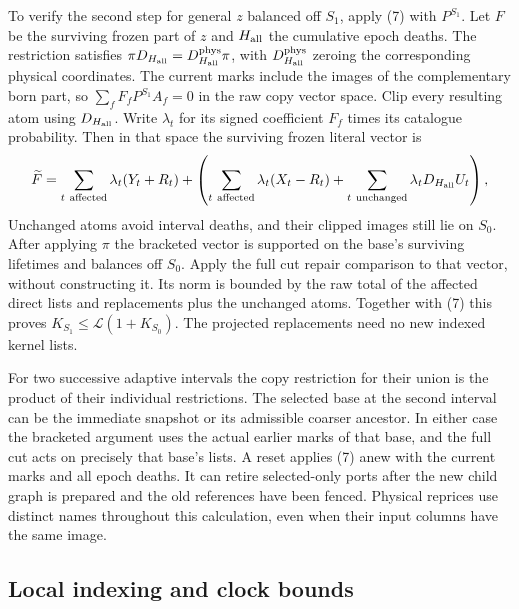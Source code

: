\documentclass[11pt]{article}
\begin{document}
To verify the second step for general \(z\) balanced off \(S_1\), apply (7) with \(P^{S_1}\). Let \(F\) be the surviving frozen part of \(z\) and \(H_{\rm all}\) the cumulative epoch deaths. The restriction satisfies \(\pi D_{H_{\rm all}}=D_{H_{\rm all}}^{\rm phys}\pi\), with \(D_{H_{\rm all}}^{\rm phys}\) zeroing the corresponding physical coordinates. The current marks include the images of the complementary born part, so \(\sum_f F_f P^{S_1} A_f=0\) in the raw copy vector space. Clip every resulting atom using \(D_{H_{\rm all}}\). Write \(\lambda_t\) for its signed coefficient \(F_f\) times its catalogue probability. Then in that space the surviving frozen literal vector is
\[
 \widetilde F=\sum_{t\ {\rm affected}}\lambda_t(Y_t+R_t)
   +\left(\sum_{t\ {\rm affected}}\lambda_t(X_t-R_t)
           +\sum_{t\ {\rm unchanged}}\lambda_t D_{H_{\rm all}} U_t\right),
\]
Unchanged atoms avoid interval deaths, and their clipped images still lie on \(S_0\). After applying \(\pi\) the bracketed vector is supported on the base's surviving lifetimes and balances off \(S_0\). Apply the full cut repair comparison to that vector, without constructing it. Its norm is bounded by the raw total of the affected direct lists and replacements plus the unchanged atoms. Together with (7) this proves \(K_{S_1}\le\mathcal L(1+K_{S_0})\). The projected replacements need no new indexed kernel lists.

For two successive adaptive intervals the copy restriction for their union is the product of their individual restrictions. The selected base at the second interval can be the immediate snapshot or its admissible coarser ancestor. In either case the bracketed argument uses the actual earlier marks of that base, and the full cut acts on precisely that base's lists. A reset applies (7) anew with the current marks and all epoch deaths. It can retire selected-only ports after the new child graph is prepared and the old references have been fenced. Physical reprices use distinct names throughout this calculation, even when their input columns have the same image.

\hypertarget{local-indexing-and-clock-bounds}{%
\subsection{Local indexing and clock bounds}\label{local-indexing-and-clock-bounds}}
\end{document}
